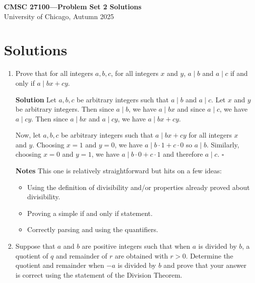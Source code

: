 \documentclass[11pt]{article}
\newcommand{\divides}{\mid}
\newenvironment{solution}{\par\noindent\textbf{Solution}\quad}{\hfill$\square$\par}
\newenvironment{notes}{\par\noindent\textbf{Notes}\quad}{\par}
\begin{document}
\begin{center}
    {\Large \textbf{CMSC 27100---Problem Set 2 Solutions}}\\[0.6em]
    {\large University of Chicago, Autumn 2025}
\end{center}

\section*{Solutions}

\begin{enumerate}[label=\arabic*.]
    \item Prove that for all integers $a,b,c$, for all integers $x$ and $y$, $a \divides b$ and $a \divides c$ if and only if $a \divides bx + cy$.

    \begin{solution}
    Let $a,b,c$ be arbitrary integers such that $a \divides b$ and $a \divides c$. Let $x$ and $y$ be arbitrary integers. Then since $a \divides b$, we have $a \divides bx$ and since $a \divides c$, we have $a \divides cy$. Then since $a \divides bx$ and $a \divides cy$, we have $a \divides bx + cy$.

    Now, let $a,b,c$ be arbitrary integers such that $a \divides bx + cy$ for all integers $x$ and $y$. Choosing $x=1$ and $y=0$, we have $a \divides b\cdot 1 + c\cdot 0$ so $a \divides b$. Similarly, choosing $x=0$ and $y=1$, we have $a \divides b\cdot 0 + c\cdot 1$ and therefore $a \divides c$.
    \end{solution}

    \begin{notes}
    This one is relatively straightforward but hits on a few ideas:
    \begin{itemize}[topsep=0.2em]
        \item Using the definition of divisibility and/or properties already proved about divisibility.
        \item Proving a simple if and only if statement.
        \item Correctly parsing and using the quantifiers.
    \end{itemize}
    \end{notes}

    \item Suppose that $a$ and $b$ are positive integers such that when $a$ is divided by $b$, a quotient of $q$ and remainder of $r$ are obtained with $r > 0$. Determine the quotient and remainder when $-a$ is divided by $b$ and prove that your answer is correct using the statement of the Division Theorem.


\end{enumerate}
\end{document}
